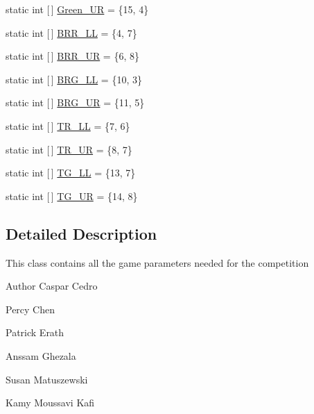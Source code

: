 \begin{DoxyCompactItemize}
\item 
static int \mbox{[}$\,$\mbox{]} \hyperlink{classca_1_1mcgill_1_1ecse211_1_1project_1_1_game_parameters_aedb13ca3822f3581bdffd464891b1494}{Green\+\_\+\+UR} = \{15, 4\}
\item 
static int \mbox{[}$\,$\mbox{]} \hyperlink{classca_1_1mcgill_1_1ecse211_1_1project_1_1_game_parameters_a8695da7f04954ea1513082740fd2d57f}{B\+R\+R\+\_\+\+LL} = \{4, 7\}
\item 
static int \mbox{[}$\,$\mbox{]} \hyperlink{classca_1_1mcgill_1_1ecse211_1_1project_1_1_game_parameters_a720d0ae20fc2466e7b77fda14bf374f3}{B\+R\+R\+\_\+\+UR} = \{6, 8\}
\item 
static int \mbox{[}$\,$\mbox{]} \hyperlink{classca_1_1mcgill_1_1ecse211_1_1project_1_1_game_parameters_ae6824f16adf03173062767f99d46b6e0}{B\+R\+G\+\_\+\+LL} = \{10, 3\}
\item 
static int \mbox{[}$\,$\mbox{]} \hyperlink{classca_1_1mcgill_1_1ecse211_1_1project_1_1_game_parameters_a644c339e7b0f11c5780f9c7de34e1e07}{B\+R\+G\+\_\+\+UR} = \{11, 5\}
\item 
static int \mbox{[}$\,$\mbox{]} \hyperlink{classca_1_1mcgill_1_1ecse211_1_1project_1_1_game_parameters_ac642730053a35524ce70866289ca10b9}{T\+R\+\_\+\+LL} = \{7, 6\}
\item 
static int \mbox{[}$\,$\mbox{]} \hyperlink{classca_1_1mcgill_1_1ecse211_1_1project_1_1_game_parameters_a45c465e9f0b53a4e752a398036be13f5}{T\+R\+\_\+\+UR} = \{8, 7\}
\item 
static int \mbox{[}$\,$\mbox{]} \hyperlink{classca_1_1mcgill_1_1ecse211_1_1project_1_1_game_parameters_a0fefeecefd65deabea205bd9d628bf76}{T\+G\+\_\+\+LL} = \{13, 7\}
\item 
static int \mbox{[}$\,$\mbox{]} \hyperlink{classca_1_1mcgill_1_1ecse211_1_1project_1_1_game_parameters_aa8220987d04f322d9480db7cc073ffd2}{T\+G\+\_\+\+UR} = \{14, 8\}
\end{DoxyCompactItemize}


\subsection{Detailed Description}
This class contains all the game parameters needed for the competition

\begin{DoxyAuthor}{Author}
Caspar Cedro 

Percy Chen 

Patrick Erath 

Anssam Ghezala 

Susan Matuszewski 

Kamy Moussavi Kafi 
\end{DoxyAuthor}


